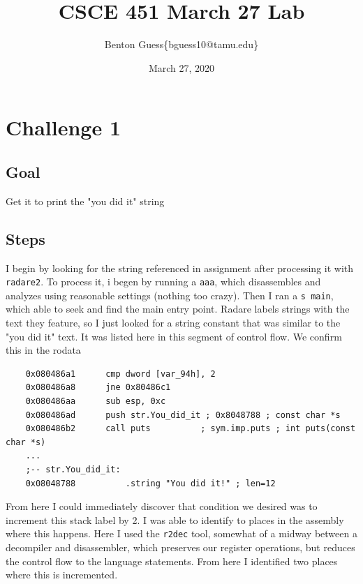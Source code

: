\documentclass[11pt]{article}
\title{CSCE 451 March 27 Lab}
\author{Benton Guess\{bguess10@tamu.edu\}}
\date{March 27, 2020}
\begin{document}
\maketitle

\section*{Challenge 1}
\subsection*{Goal}
Get it to print the "you did it" string

\subsection*{Steps}
I begin by looking for the string referenced in assignment after processing it with \texttt{radare2}. To process it, i begen by running a \texttt{aaa}, which disassembles and analyzes using reasonable settings (nothing too crazy). Then I ran a \texttt{s main}, which able to seek and find the main entry point. Radare labels strings with the text they feature, so I just looked for a string constant that was similar to the "you did it" text. It was listed here in this segment of control flow. We confirm this in the rodata

\begin{lstlisting}
    0x080486a1      cmp dword [var_94h], 2
    0x080486a8      jne 0x80486c1
    0x080486aa      sub esp, 0xc
    0x080486ad      push str.You_did_it ; 0x8048788 ; const char *s
    0x080486b2      call puts          ; sym.imp.puts ; int puts(const char *s)
    ...
    ;-- str.You_did_it:
    0x08048788          .string "You did it!" ; len=12
\end{lstlisting}
From here I could immediately discover that condition we desired was to increment this stack label by 2. I was able to identify to places in the assembly where this happens. Here I used the \texttt{r2dec} tool, somewhat of a midway between a decompiler and disassembler, which preserves our register operations, but reduces the control flow to the language statements. From here I identified two places where this is incremented.
\end{document}
